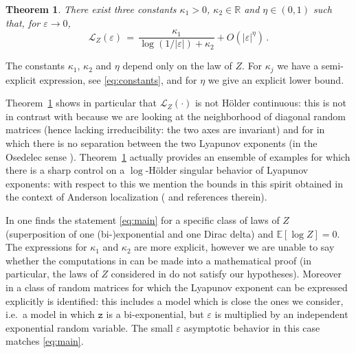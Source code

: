 \documentclass[reqno,11pt]{amsart}
\numberwithin{equation}{section}
\newtheorem{theorem}{Theorem}[section]
\newcommand{\cL}{{\ensuremath{\mathcal L}} }
\newcommand{\bbE}{{\ensuremath{\mathbb E}} }
\newcommand{\bbR}{{\ensuremath{\mathbb R}} }
\newcommand{\gep}{\varepsilon}       %
\newcommand{\logZ}{\mathtt{z}}
\begin{document}
\medskip

\begin{theorem}
\label{th:main}
There exist three constants $\kappa_1>0$, $\kappa_2 \in \bbR$  
and $\eta \in (0,1)$ such that, for $\gep \to 0$,
\begin{equation}
\label{eq:main}
\cL_Z(\gep)\, =\,  \frac {\kappa_1}{  \log (1/ \vert\gep\vert ) +\kappa_2 } + O\left( \vert\gep\vert^\eta\right)\, .
\end{equation}
\end{theorem} 

\medskip

 The constants $\kappa_1$, $\kappa_2$ and $\eta$ depend only on the law of $Z$.
For $\kappa_j$  we have a semi-explicit expression, see \eqref{eq:constants},
and for $\eta$ we give an explicit lower bound. %

\smallskip

Theorem~\ref{th:main} shows in particular that $\cL_Z(\cdot)$ is not H\"older continuous: this is not in  contrast with
  \cite{cf:BaDu,cf:lepage} 
  because we are looking at the neighborhood of diagonal random matrices (hence lacking irreducibility: the two axes are invariant) and for in which there is no separation between the two Lyapunov exponents (in the Osedelec sense  \cite[Ch.~IV]{cf:BL}). 
  Theorem~\ref{th:main} actually provides an ensemble of examples for which there is a  sharp control on a $\log$-H\"older singular behavior of Lyapunov exponents:
 with respect to this we mention the bounds in this spirit obtained in the context  of Anderson localization (\cite{cf:CS} and references therein).
  
 
 




In  \cite[(4.34) and pp. 1218-1220]{cf:NL}  one finds the statement \eqref{eq:main}
 for a specific class of laws of $Z$ (superposition of one (bi-)exponential and one Dirac delta) and $\bbE[ \log Z]=0$.
 The expressions for $\kappa_1$ and $\kappa_2$ are more explicit, however we are unable to say whether 
 the computations in \cite{cf:NL} can be made into a mathematical proof (in particular, the laws of $Z$ considered in  \cite{cf:NL}
 do not satisfy our hypotheses). Moreover in \cite{cf:CTT} a class of random matrices for which the Lyapunov exponent can be  expressed explicitly is identified: this includes a model which is close the ones we consider, i.e.\ a model in which $\logZ$ is a bi-exponential, but $\gep$ is multiplied by an independent exponential random variable. The small $\gep$ asymptotic behavior in this case matches \eqref{eq:main}.
 
\end{document}
